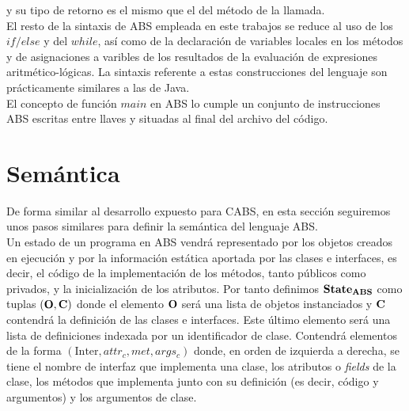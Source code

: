 

y su tipo de retorno es el mismo que el del método de la llamada.\\

El resto de la sintaxis de ABS empleada en este trabajos se reduce al uso de los $if/else$ y del $while$, así como de la declaración de variables locales en los métodos y de asignaciones a varibles de los resultados de la evaluación de expresiones aritmético-lógicas. La sintaxis referente a estas construcciones del lenguaje son prácticamente similares a las de Java.\\

El concepto de función $main$ en ABS lo cumple un conjunto de instrucciones ABS escritas entre llaves y situadas al final del archivo del código.

\section{Semántica}

De forma similar al desarrollo expuesto para CABS, en esta sección seguiremos unos pasos similares para definir la semántica del lenguaje ABS.\\

Un estado de un programa en ABS vendrá representado por los objetos creados en ejecución y por la información estática aportada por las clases e interfaces, es decir, el código de la implementación de los métodos, tanto públicos como privados, y la inicialización de los atributos. Por tanto definimos $\textbf{State}_{\textbf{ABS}}$ como tuplas $(\mathbf{O}, \mathbf{C})$ donde el elemento $\mathbf{O}$ será una lista de objetos instanciados y $\mathbf{C}$ contendrá la definición de las clases e interfaces. Este último elemento será una lista de definiciones indexada por un identificador de clase. Contendrá elementos de la forma $(\mbox{Inter}, attr_c, met, args_c)$ donde, en orden de izquierda a derecha, se tiene el nombre de interfaz que implementa una clase, los atributos o \emph{fields} de la clase, los métodos que implementa junto con su definición (es decir, código y argumentos) y los argumentos de clase.\\

